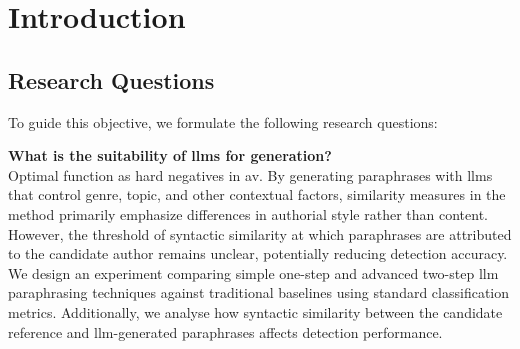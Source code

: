 \chapter{Introduction}
\label{chap:introduction}





\section{Research Questions}
\label{sec:research_questions}
To guide this objective, we formulate the following research questions:
\begin{questions}
    \item \textbf{What is the suitability of \acp{llm} for \imp{} generation?} \label{enum:rq1} \hfill \\
    Optimal \imps{} function as hard negatives in \ac{av}.
    By generating paraphrases with \acp{llm} that control genre, topic, and other contextual factors, similarity measures in the \imp{} method primarily emphasize differences in authorial style rather than content.
    However, the threshold of syntactic similarity at which paraphrases are attributed to the candidate author remains unclear, potentially reducing detection accuracy.
    We design an experiment comparing simple one-step and advanced two-step \ac{llm} paraphrasing techniques against traditional baselines using standard classification metrics.
    Additionally, we analyse how syntactic similarity between the candidate reference and \ac{llm}-generated paraphrases affects detection performance.


\end{questions}
